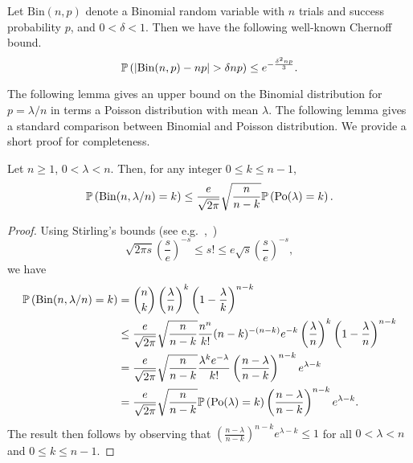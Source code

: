 \begin{appendices}
Let $\mathrm{Bin}(n,p)$ denote a Binomial random variable with $n$ trials and success probability $p$, and $0 < \delta < 1$. Then we have the following well-known Chernoff bound.
\begin{equation}\label{eq:def_chernoff_bound_binomial}
	\mathbb{P}\left(|\mathrm{Bin}(n,p) - np| > \delta np\right) \le e^{-\frac{\delta^2 np}{3}}.
\end{equation}

The following lemma gives an upper bound on the Binomial distribution for $p = \lambda/n$ in terms a Poisson distribution with mean $\lambda$.
The following lemma  gives a standard comparison between Binomial and Poisson distribution. We provide a short proof  for completeness.

\begin{lemma}\label{lem:binomial_poisson_bound}
Let $n \ge 1$, $0 < \lambda < n$. Then, for any integer $0 \le k \le n - 1$,
\[
	\mathbb{P}\left(\mathrm{Bin}(n,\lambda/n) = k\right) \le \frac{e}{\sqrt{2\pi}} \sqrt{\frac{n}{n-k}} \mathbb{P}\left({\mathrm{Po}}(\lambda) = k\right).
\]
\end{lemma}

\begin{proof}
Using Stirling's bounds (see e.g.~\cite{Dutkay2013},~\cite{Nanjundiah1959})
	\[
	\sqrt{2\pi s} \left(\frac{s}{e}\right)^{-s} \le s! \le e \sqrt{s} \left(\frac{s}{e}\right)^{-s},
	\]
we have
\begin{align*}
	\mathbb{P}\left(\mathrm{Bin}(n,\lambda/n) = k\right)
	&= \binom{n}{k} \left(\frac{\lambda}{n}\right)^k \left(1 - \frac{\lambda}{k}\right)^{n - k}\\
	&\le \frac{e}{\sqrt{2\pi}} \sqrt{\frac{n}{n - k}} \frac{n^n}{k!} (n-k)^{-(n-k)} e^{-k}
		\left(\frac{\lambda}{n}\right)^k \left(1 - \frac{\lambda}{n}\right)^{n - k}\\
	&= \frac{e}{\sqrt{2\pi}} \sqrt{\frac{n}{n - k}} \frac{\lambda^k e^{-\lambda}}{k!}
		\left(\frac{n-\lambda}{n - k}\right)^{n - k} e^{\lambda - k}\\
	&= \frac{e}{\sqrt{2\pi}} \sqrt{\frac{n}{n-k}} \mathbb{P}\left({\mathrm{Po}}(\lambda) = k\right)
		\left(\frac{n-\lambda}{n - k}\right)^{n - k} e^{\lambda - k}.
\end{align*}
The result then follows by observing that $\left(\frac{n-\lambda}{n - k}\right)^{n - k} e^{\lambda - k} \le 1$ for all $0 < \lambda < n$ and $0 \le k \le n - 1$.
\end{proof}


\end{appendices}
